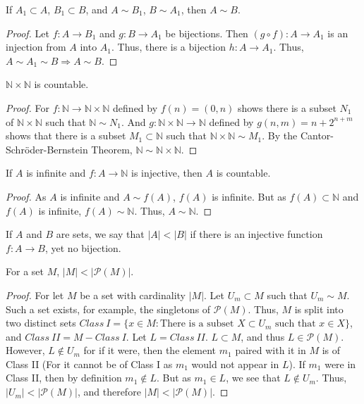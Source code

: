         \begin{theorem}
        If $A_1 \subset A$, $B_1 \subset B$, and $A\sim B_1$, $B \sim A_1$, then $A\sim B$.
        \end{theorem}
        \begin{proof}
        Let $f:A\rightarrow B_1$ and $g:B\rightarrow A_1$ be bijections.
        Then $(g\circ f):A\rightarrow A_1$ is an injection from $A$ into $A_1$.
        Thus, there is a bijection $h:A\rightarrow A_1$. Thus, $A\sim A_1 \sim B\Rightarrow A\sim B$.
        \end{proof}
        \begin{theorem}
        $\mathbb{N}\times \mathbb{N}$ is countable.
        \end{theorem}
        \begin{proof}
        For $f:\mathbb{N} \rightarrow \mathbb{N}\times \mathbb{N}$ defined by $f(n) = (0,n)$
        shows there is a subset $N_1$ of $\mathbb{N} \times \mathbb{N}$ such that
        $\mathbb{N}\sim N_1$. And $g:\mathbb{N}\times \mathbb{N} \rightarrow \mathbb{N}$
        defined by $g(n,m) =n+2^{n+m}$ shows that there is a subset $M_1 \subset \mathbb{N}$
        such that $\mathbb{N} \times \mathbb{N} \sim M_1$. By the Cantor-Schr\"{o}der-Bernstein Theorem,
        $\mathbb{N} \sim \mathbb{N}\times \mathbb{N}$.
        \end{proof}
        \begin{lemma}
        If $A$ is infinite and $f:A\rightarrow \mathbb{N}$ is injective, then $A$ is countable.
        \end{lemma}
        \begin{proof}
        As $A$ is infinite and $A\sim f(A)$, $f(A)$ is infinite.
        But as $f(A)\subset \mathbb{N}$ and $f(A)$ is infinite,
        $f(A)\sim \mathbb{N}$. Thus, $A\sim \mathbb{N}$.
        \end{proof}
        \begin{definition}
        If $A$ and $B$ are sets, we say that $|A|<|B|$ if there is an injective function
        $f:A\rightarrow B$, yet no bijection.
        \end{definition}
        \begin{theorem}
        For a set $M$, $|M|<|\mathcal{P}(M)|$.
        \end{theorem}
        \begin{proof}
        For let $M$ be a set with cardinality $|M|$. Let $U_m \subset M$ such that $U_m \sim M$.
        Such a set exists, for example, the singletons of $\mathcal{P}(M)$. Thus, $M$ is split into
        two distinct sets $Class\ I=\{x\in M: \textrm{There is a subset } X\subset U_m\textrm{ such that }x\in X\}$,
        and $Class\ II=M-Class\ I$. Let $L = Class\ II$. $L\subset M$, and thus $L\in \mathcal{P}(M)$. However,
        $L \notin U_m$ for if it were, then the element $m_1$ paired with it in $M$ is of Class II
        (For it cannot be of Class I as $m_1$ would not appear in $L$). If $m_1$ were in Class II,
        then by definition $m_1 \notin L$. But as $m_1 \in L$, we see that $L\notin U_m$. Thus,
        $|U_m| <|\mathcal{P}(M)|$, and therefore $|M|<|\mathcal{P}(M)|$.
        \end{proof}
